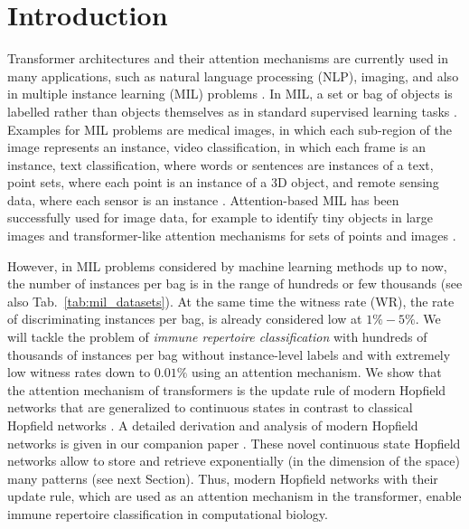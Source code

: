 \documentclass[oneside]{book}
\begin{document}
\section*{Introduction}
\vspace{\cheatspace}
\label{introduction}
%
Transformer architectures \citep{vaswani2017attention} and their attention mechanisms are currently used
in many applications, such as natural language processing (NLP), imaging, and 
also in multiple instance learning (MIL) problems \citep{lee2019set}. 
In MIL, a set or bag of objects is labelled rather than objects 
themselves as in 
standard supervised learning tasks \citep{dietterich1997solving}. 
Examples for MIL problems are 
medical images, in which each sub-region of the image represents an instance,
video classification, in which each frame is an instance,
text classification, where words or sentences are instances of a text,
point sets, where each point is an instance of a 3D object, and
remote sensing data, where each sensor is an instance \citep{carbonneau2018survey,uriot2019learning}.
Attention-based MIL has been successfully used for
image data, for example to identify tiny objects 
in large images \citep{ilse2018attention,pawlowski2019needles,tomita2019attention,kimeswenger2019detecting}
and transformer-like attention mechanisms for sets of points and images \citep{lee2019set}. 

%
However, in MIL problems considered by machine learning methods
up to now, the number of instances per bag is in the range of hundreds or few thousands \citep{carbonneau2018survey,lee2019set} (see also Tab.~\ref{tab:mil_datasets}).
At the same time the witness rate (WR), the rate of discriminating instances per bag, 
is already considered low at $1\%-5\%$. We will tackle 
the problem of \emph{immune repertoire classification} with hundreds of thousands of instances 
per bag without instance-level labels and with extremely low witness rates
down to $0.01\%$ using an attention mechanism.
%
We show that the attention mechanism of transformers 
is the update rule of modern Hopfield networks \citep{Krotov:16,Krotov:18,Demircigil:17}
that are generalized to continuous states in contrast to classical Hopfield networks
\citep{Hopfield:82}.
%
A detailed derivation and analysis of
modern Hopfield networks is given 
in our companion paper \citep{Ramsauer:20}.
These novel continuous state Hopfield networks allow to store and retrieve
exponentially (in the dimension of the space) many patterns 
(see next Section). %
Thus, modern Hopfield networks with their update rule, which are 
used as an attention mechanism in the transformer, enable 
%
immune repertoire classification in computational biology.
%
\end{document}

